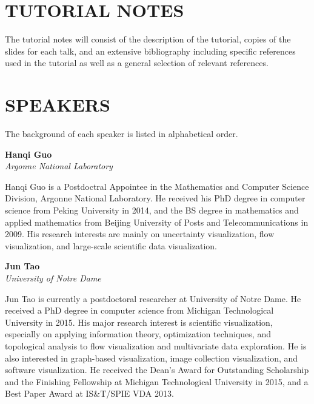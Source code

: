 \documentclass[preprint,journal]{vgtc}       %
\newcommand{\addverticalspace}{\vspace{3mm}}
\begin{document}
\section*{TUTORIAL NOTES}
The tutorial notes will consist of the description of the tutorial, copies of the slides for each talk, and an extensive bibliography including specific references used in the tutorial as well as a general selection of relevant references.

\section*{SPEAKERS}
The background of each speaker is listed in alphabetical order.

\addverticalspace

\noindent \textbf{Hanqi Guo}\\
\emph{Argonne National Laboratory}

\addverticalspace

Hanqi Guo is a Postdoctral Appointee in the Mathematics and Computer Science Division, Argonne National Laboratory. He received his PhD degree in computer science from Peking University in 2014, and the BS degree in mathematics and applied mathematics from Beijing University of Posts and Telecommunications in 2009. His research interests are mainly on uncertainty visualization, flow visualization, and large-scale scientific data visualization.

\printbibliography[title={Relevant Publications},category=Guo]

\noindent \textbf{Jun Tao}\\
\emph{University of Notre Dame}

\addverticalspace

Jun Tao is currently a postdoctoral researcher at University of Notre Dame. He received a PhD degree in computer science from Michigan Technological University in 2015. His major research interest is scientific visualization, especially on applying information theory, optimization techniques, and topological analysis to flow visualization and multivariate data exploration. He is also interested in graph-based visualization, image collection visualization, and software visualization. He received the Dean’s Award for Outstanding Scholarship and the Finishing Fellowship at Michigan Technological University in 2015, and a Best Paper Award at IS\&T/SPIE VDA 2013.

\printbibliography[title={Relevant Publications},category=Tao]
\end{document}
